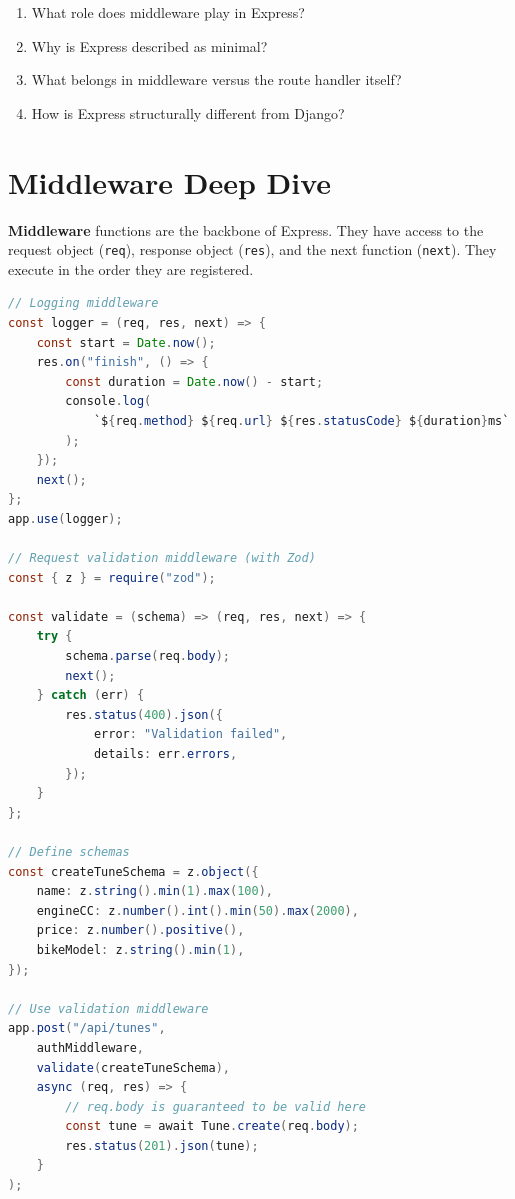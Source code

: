 \documentclass[12pt, a4paper, oneside]{book}
\begin{document}
\begin{recallbox}
\begin{enumerate}[leftmargin=2em]
    \item What role does middleware play in Express?
    \item Why is Express described as minimal?
    \item What belongs in middleware versus the route handler itself?
    \item How is Express structurally different from Django?
\end{enumerate}
\end{recallbox}



\section{Middleware Deep Dive}

\textbf{Middleware} functions are the backbone of Express. They have access to the request object (\texttt{req}), response object (\texttt{res}), and the next function (\texttt{next}). They execute in the order they are registered.

\begin{lstlisting}[language=Java, caption={Express middleware patterns}]
// Logging middleware
const logger = (req, res, next) => {
    const start = Date.now();
    res.on("finish", () => {
        const duration = Date.now() - start;
        console.log(
            `${req.method} ${req.url} ${res.statusCode} ${duration}ms`
        );
    });
    next();
};
app.use(logger);

// Request validation middleware (with Zod)
const { z } = require("zod");

const validate = (schema) => (req, res, next) => {
    try {
        schema.parse(req.body);
        next();
    } catch (err) {
        res.status(400).json({
            error: "Validation failed",
            details: err.errors,
        });
    }
};

// Define schemas
const createTuneSchema = z.object({
    name: z.string().min(1).max(100),
    engineCC: z.number().int().min(50).max(2000),
    price: z.number().positive(),
    bikeModel: z.string().min(1),
});

// Use validation middleware
app.post("/api/tunes",
    authMiddleware,
    validate(createTuneSchema),
    async (req, res) => {
        // req.body is guaranteed to be valid here
        const tune = await Tune.create(req.body);
        res.status(201).json(tune);
    }
);
\end{lstlisting}
\end{document}
